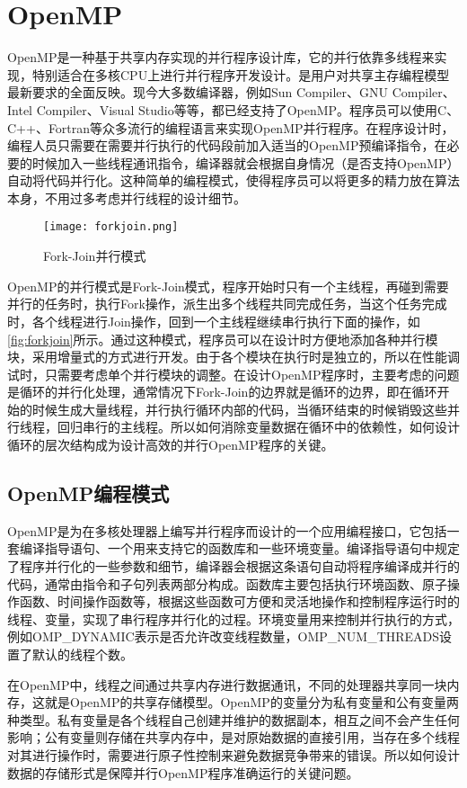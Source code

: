 \section{OpenMP}
OpenMP是一种基于共享内存实现的并行程序设计库，它的并行依靠多线程来实现，特别适合在多核CPU上进行并行程序开发设计。是用户对共享主存编程模型最新要求的全面反映。现今大多数编译器，例如Sun Compiler、GNU Compiler、Intel Compiler、Visual Studio等等，都已经支持了OpenMP。程序员可以使用C、C++、Fortran等众多流行的编程语言来实现OpenMP并行程序。在程序设计时，编程人员只需要在需要并行执行的代码段前加入适当的OpenMP预编译指令，在必要的时候加入一些线程通讯指令，编译器就会根据自身情况（是否支持OpenMP）自动将代码并行化。这种简单的编程模式，使得程序员可以将更多的精力放在算法本身，不用过多考虑并行线程的设计细节。
\begin{figure}[htbp]
	\centering
	\texttt{[image: forkjoin.png]}
	\caption{Fork-Join并行模式}\label{fig:forkjoin}
\end{figure}
OpenMP的并行模式是Fork-Join模式，程序开始时只有一个主线程，再碰到需要并行的任务时，执行Fork操作，派生出多个线程共同完成任务，当这个任务完成时，各个线程进行Join操作，回到一个主线程继续串行执行下面的操作，如\autoref{fig:forkjoin}所示。通过这种模式，程序员可以在设计时方便地添加各种并行模块，采用增量式的方式进行开发。由于各个模块在执行时是独立的，所以在性能调试时，只需要考虑单个并行模块的调整。在设计OpenMP程序时，主要考虑的问题是循环的并行化处理，通常情况下Fork-Join的边界就是循环的边界，即在循环开始的时候生成大量线程，并行执行循环内部的代码，当循环结束的时候销毁这些并行线程，回归串行的主线程。所以如何消除变量数据在循环中的依赖性，如何设计循环的层次结构成为设计高效的并行OpenMP程序的关键。

\subsection{OpenMP编程模式}
OpenMP是为在多核处理器上编写并行程序而设计的一个应用编程接口，它包括一套编译指导语句、一个用来支持它的函数库和一些环境变量。编译指导语句中规定了程序并行化的一些参数和细节，编译器会根据这条语句自动将程序编译成并行的代码，通常由指令和子句列表两部分构成。函数库主要包括执行环境函数、原子操作函数、时间操作函数等，根据这些函数可方便和灵活地操作和控制程序运行时的线程、变量，实现了串行程序并行化的过程。环境变量用来控制并行执行的方式，例如OMP\_DYNAMIC表示是否允许改变线程数量，OMP\_NUM\_THREADS设置了默认的线程个数。

在OpenMP中，线程之间通过共享内存进行数据通讯，不同的处理器共享同一块内存，这就是OpenMP的共享存储模型。OpenMP的变量分为私有变量和公有变量两种类型。私有变量是各个线程自己创建并维护的数据副本，相互之间不会产生任何影响；公有变量则存储在共享内存中，是对原始数据的直接引用，当存在多个线程对其进行操作时，需要进行原子性控制来避免数据竞争带来的错误。所以如何设计数据的存储形式是保障并行OpenMP程序准确运行的关键问题。

